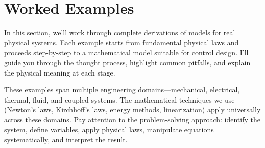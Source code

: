 \section{Worked Examples}

In this section, we'll work through complete derivations of models for real physical systems. Each example starts from fundamental physical laws and proceeds step-by-step to a mathematical model suitable for control design. I'll guide you through the thought process, highlight common pitfalls, and explain the physical meaning at each stage.

These examples span multiple engineering domains—mechanical, electrical, thermal, fluid, and coupled systems. The mathematical techniques we use (Newton's laws, Kirchhoff's laws, energy methods, linearization) apply universally across these domains. Pay attention to the problem-solving approach: identify the system, define variables, apply physical laws, manipulate equations systematically, and interpret the result.

